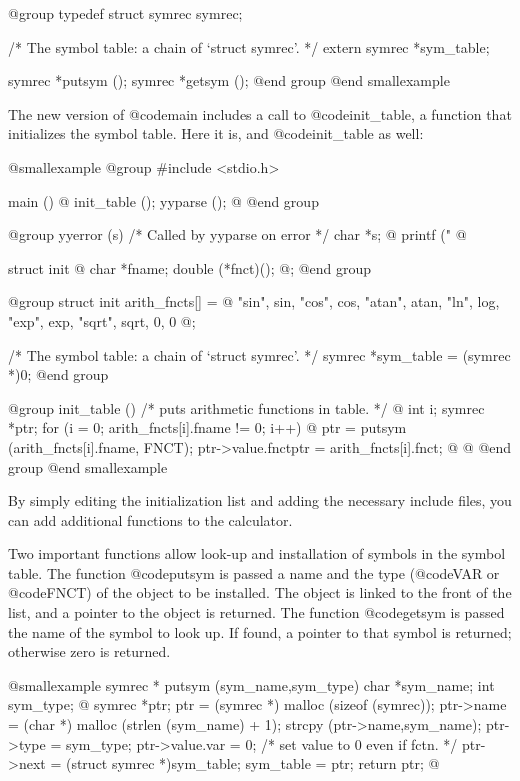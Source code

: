 {{{{{{{{{{{{{{@group
typedef struct symrec symrec;

/* The symbol table: a chain of `struct symrec'.     */
extern symrec *sym_table;

symrec *putsym ();
symrec *getsym ();
@end group
@end smallexample

The new version of @code{main} includes a call to @code{init_table}, a
function that initializes the symbol table.  Here it is, and
@code{init_table} as well:

@smallexample
@group
#include <stdio.h>

main ()
@{
  init_table ();
  yyparse ();
@}
@end group

@group
yyerror (s)  /* Called by yyparse on error */
     char *s;
@{
  printf ("%
@}

struct init
@{
  char *fname;
  double (*fnct)();
@};
@end group

@group
struct init arith_fncts[]
  = @{
      "sin", sin,
      "cos", cos,
      "atan", atan,
      "ln", log,
      "exp", exp,
      "sqrt", sqrt,
      0, 0
    @};

/* The symbol table: a chain of `struct symrec'.  */
symrec *sym_table = (symrec *)0;
@end group

@group
init_table ()  /* puts arithmetic functions in table. */
@{
  int i;
  symrec *ptr;
  for (i = 0; arith_fncts[i].fname != 0; i++)
    @{
      ptr = putsym (arith_fncts[i].fname, FNCT);
      ptr->value.fnctptr = arith_fncts[i].fnct;
    @}
@}
@end group
@end smallexample

By simply editing the initialization list and adding the necessary include
files, you can add additional functions to the calculator.

Two important functions allow look-up and installation of symbols in the
symbol table.  The function @code{putsym} is passed a name and the type
(@code{VAR} or @code{FNCT}) of the object to be installed.  The object is
linked to the front of the list, and a pointer to the object is returned.
The function @code{getsym} is passed the name of the symbol to look up.  If
found, a pointer to that symbol is returned; otherwise zero is returned.

@smallexample
symrec *
putsym (sym_name,sym_type)
     char *sym_name;
     int sym_type;
@{
  symrec *ptr;
  ptr = (symrec *) malloc (sizeof (symrec));
  ptr->name = (char *) malloc (strlen (sym_name) + 1);
  strcpy (ptr->name,sym_name);
  ptr->type = sym_type;
  ptr->value.var = 0; /* set value to 0 even if fctn.  */
  ptr->next = (struct symrec *)sym_table;
  sym_table = ptr;
  return ptr;
@}

}}}}}}}}}}}}}}

